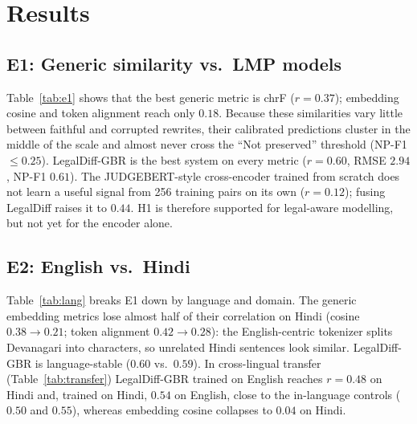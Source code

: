 \section{Results}
\subsection{E1: Generic similarity vs.\ LMP models}
Table~\ref{tab:e1} shows that the best generic metric is chrF ($r=0.37$); embedding cosine and token alignment reach only $0.18$. Because these similarities vary little between faithful and corrupted rewrites, their calibrated predictions cluster in the middle of the scale and almost never cross the ``Not preserved'' threshold (NP-F1 $\le 0.25$). LegalDiff-GBR is the best system on every metric ($r=0.60$, RMSE $2.94$, NP-F1 $0.61$). The JUDGEBERT-style cross-encoder trained from scratch does not learn a useful signal from 256 training pairs on its own ($r=0.12$); fusing LegalDiff raises it to $0.44$. H1 is therefore supported for legal-aware modelling, but not yet for the encoder alone.

\begin{table}[t]
\caption{E1: 5-fold grouped CV on EnHi-LMP ($n=320$)}\label{tab:e1}
\centering\footnotesize\setlength{\tabcolsep}{3pt}
\end{table}

\subsection{E2: English vs.\ Hindi}
Table~\ref{tab:lang} breaks E1 down by language and domain. The generic embedding metrics lose almost half of their correlation on Hindi (cosine $0.38\rightarrow0.21$; token alignment $0.42\rightarrow0.28$): the English-centric tokenizer splits Devanagari into characters, so unrelated Hindi sentences look similar. LegalDiff-GBR is language-stable ($0.60$ vs.\ $0.59$). In cross-lingual transfer (Table~\ref{tab:transfer}) LegalDiff-GBR trained on English reaches $r=0.48$ on Hindi and, trained on Hindi, $0.54$ on English, close to the in-language controls ($0.50$ and $0.55$), whereas embedding cosine collapses to $0.04$ on Hindi.

